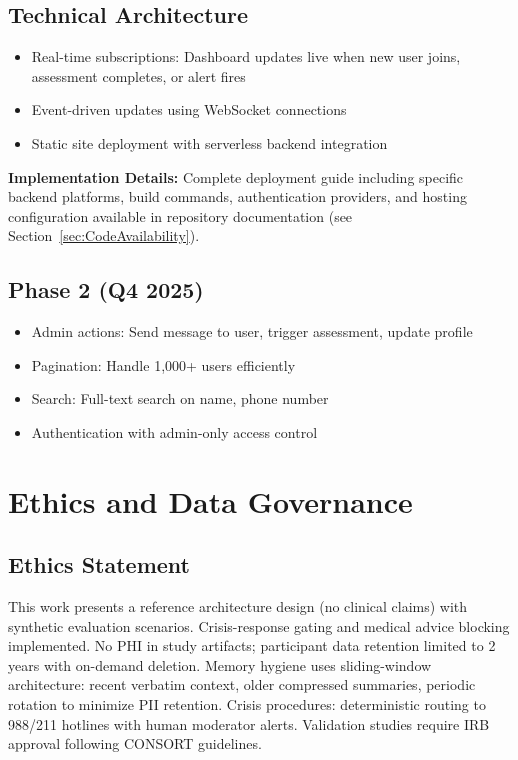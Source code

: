\documentclass{article}
\begin{document}
\subsection*{Technical Architecture}
\begin{itemize}
    \item Real-time subscriptions: Dashboard updates live when new user joins, assessment completes, or alert fires
    \item Event-driven updates using WebSocket connections
    \item Static site deployment with serverless backend integration
\end{itemize}

\textbf{Implementation Details:} Complete deployment guide including specific backend platforms, build commands, authentication providers, and hosting configuration available in repository documentation (see Section~\ref{sec:CodeAvailability}).

\subsection*{Phase 2 (Q4 2025)}
\begin{itemize}
    \item Admin actions: Send message to user, trigger assessment, update profile
    \item Pagination: Handle 1,000+ users efficiently
    \item Search: Full-text search on name, phone number
    \item Authentication with admin-only access control
\end{itemize}

%
\appendix
\section{Ethics and Data Governance}%
\label{sec:EthicsandDataGovernance}%
\subsection{Ethics Statement}%
\label{subsec:EthicsStatement}%
This work presents a reference architecture design (no clinical claims) with synthetic evaluation scenarios. Crisis-response gating and medical advice blocking implemented. No PHI in study artifacts; participant data retention limited to 2 years with on-demand deletion. Memory hygiene uses sliding-window architecture: recent verbatim context, older compressed summaries, periodic rotation to minimize PII retention. Crisis procedures: deterministic routing to 988/211 hotlines with human moderator alerts. Validation studies require IRB approval following CONSORT guidelines.
\end{document}
